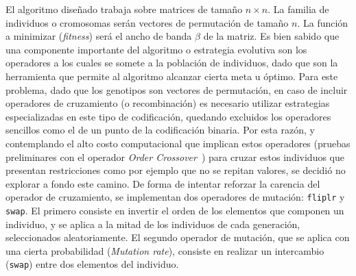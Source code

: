 El algoritmo diseñado trabaja sobre matrices de tamaño $n \times n$. La familia de individuos o cromosomas serán vectores de permutación de tamaño $n$. La función a minimizar (\textit{fitness}) será el ancho de banda $\beta$ de la matriz. 
Es bien sabido que una componente importante del algoritmo o estrategia evolutiva son los operadores a los cuales se somete a la población de individuos, dado que son la herramienta que permite al algoritmo alcanzar cierta meta u óptimo. 
Para este problema, dado que los genotipos son vectores de permutación, en caso de incluir operadores de cruzamiento (o recombinación) es necesario utilizar estrategias especializadas en este tipo de codificación, quedando excluidos los operadores sencillos como el de un punto de la codificación binaria. Por esta razón, y contemplando el alto costo computacional que implican estos operadores (pruebas preliminares con el operador \textit{Order Crossover}~\cite{AJ2015}) para cruzar estos individuos que presentan restricciones como por ejemplo que no se repitan valores, se decidió no explorar a fondo este camino.
 De forma de intentar reforzar la carencia del operador de cruzamiento, se implementan dos operadores de mutación: \texttt{fliplr} y \texttt{swap}. El primero consiste en invertir el orden de los elementos que componen un individuo, y se aplica a la mitad de los individuos de cada generación, seleccionados aleatoriamente. El segundo operador de mutación, que se aplica con una cierta probabilidad (\textit{Mutation rate}), consiste en realizar un intercambio (\texttt{swap}) entre dos elementos del individuo.

